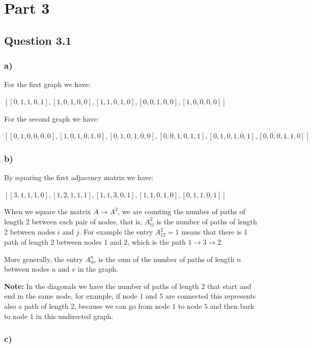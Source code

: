 \documentclass{article}
\begin{document}
\newpage

\section*{Part 3}

\subsection*{Question 3.1}

\subsubsection*{a)}

For the first graph we have:

$[
[0, 1, 1, 0, 1],
[1, 0, 1, 0, 0],
[1, 1, 0, 1, 0],
[0, 0, 1, 0, 0],
[1, 0, 0, 0, 0]]$

For the second graph we have:

$[
[0, 1, 0, 0, 0, 0],
[1, 0, 1, 0, 1, 0],
[0, 1, 0, 1, 0, 0],
[0, 0, 1, 0, 1, 1],
[0, 1, 0, 1, 0, 1], 
[0, 0, 0, 1, 1, 0]]$

\subsubsection*{b)}

By squaring the first adjacency matrix we have:

$[
[3, 1, 1, 1, 0],
[1, 2, 1, 1, 1],
[1, 1, 3, 0, 1],
[1, 1, 0, 1, 0],
[0, 1, 1, 0, 1]]$

When we square the matrix $A \rightarrow A^2$, we are counting the number of paths of length 2 between each pair of nodes,
that is, $A_{ij}^2$ is the number of paths of length 2 between nodes $i$ and $j$.
For example the entry $A_{12}^2 = 1$ means that there is 1 path of length 2 between nodes 1 and 2, which is the path
$1 \rightarrow 3 \rightarrow 2$.

More generally, the entry $A_{uv}^n$ is the sum of the number of paths of length $n$ between nodes $u$ and $v$ in the graph.

\textbf{Note:} In the diagonals we have the number of paths of length 2 that start and end in the same node, for example,
if node $1$ and $5$ are connected this represents also a path of length 2, because we can go from node $1$ to node $5$ and
then back to node $1$ in this undirected graph.

\subsubsection*{c)}
\end{document}
